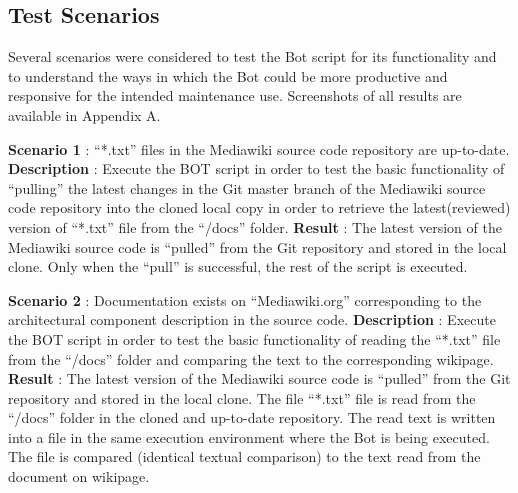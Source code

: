 \subsection{Test Scenarios}
Several scenarios were considered to test the Bot script for its functionality and to understand the ways in which the Bot could be more productive and responsive for the intended maintenance use. Screenshots of all results are available in Appendix A.
\begin{mdframed}[leftmargin=10pt,rightmargin=10pt]
\textbf{Scenario 1} : \enquote{*.txt} files in the Mediawiki source code repository are up-to-date.
\newline
\newline \textbf{Description} : Execute the BOT script in order to test the basic functionality of \enquote{pulling} the latest changes in the Git master branch of the Mediawiki source code repository into the cloned local copy in order to retrieve the latest(reviewed) version of \enquote{*.txt} file from the \enquote{/docs} folder.
\newline 
\newline \textbf{Result} : The latest version of the Mediawiki source code is \enquote{pulled} from the Git repository and stored in the local clone. Only when the \enquote{pull} is successful, the rest of the script is executed.
\end{mdframed}
\begin{mdframed}[leftmargin=10pt,rightmargin=10pt]
\textbf{Scenario 2} : Documentation exists on \enquote{Mediawiki.org} corresponding to the architectural component description in the source code.
\newline
\newline \textbf{Description} : Execute the BOT script in order to test the basic functionality of reading the \enquote{*.txt} file from the \enquote{/docs} folder and comparing the text to the corresponding wikipage.
\newline 
\newline \textbf{Result} : The latest version of the Mediawiki source code is \enquote{pulled} from the Git repository and stored in the local clone. The file \enquote{*.txt} file is read from the \enquote{/docs} folder in the cloned and up-to-date repository. The read text is written into a file in the same execution environment where the Bot is being executed. The file is compared (identical textual comparison) to the text read from the document on wikipage.
\end{mdframed}
